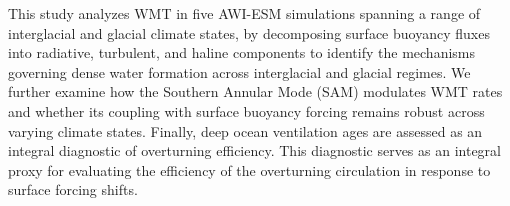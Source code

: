 \documentclass[draft]{agujournal2025}
\begin{document}




This study analyzes WMT in five AWI-ESM simulations spanning a range of interglacial and glacial climate states, by decomposing surface buoyancy fluxes into radiative, turbulent, and haline components to identify the mechanisms governing dense water formation across interglacial and glacial regimes. We further examine how the Southern Annular Mode (SAM) modulates WMT rates and whether its coupling with surface buoyancy forcing remains robust across varying climate states. Finally, deep ocean ventilation ages are assessed as an integral diagnostic of overturning efficiency. This diagnostic serves as  an integral proxy for evaluating the efficiency of the overturning circulation in response to surface forcing shifts.




\end{document}
